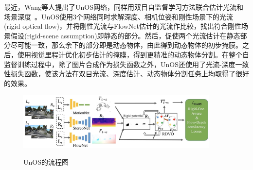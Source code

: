 最近，Wang等人提出了UnOS网络，同样用双目自监督学习方法联合估计光流和场景深度~\cite{unos}。UnOS使用3个网络同时求解深度、相机位姿和刚性场景下的光流(rigid optical flow)，并将刚性光流与FlowNet估计的光流作比较，找出符合刚性场景假设(rigid-scene assumption)即静态的部分。然后，促使两个光流估计在静态部分尽可能一致，那么余下的部分即是动态物体，由此得到动态物体的初步掩膜。之后，使用视觉里程计优化初步估计的掩膜，得到更精准的动态物体分割。在整个自监督训练过程中，除了图片合成作为损失函数之外，UnOS还使用了光流-深度一致性损失函数，使该方法在双目光流、深度估计、动态物体分割任务上均取得了很好的效果。

\begin{figure}[htbp]
	\centering
	\includegraphics[width=0.9\textwidth]{figs/1-2/unos.jpg} 
	\label{geonet}
	\caption{UnOS的流程图}
\end{figure}


